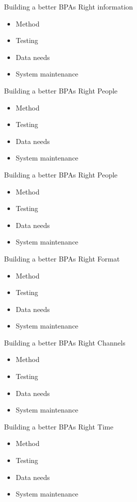 \documentclass[10pt]{beamer}
\begin{document}
\begin{frame}{Building a better BPAs}
Right information
\begin{itemize}
	\item Method
	\item Testing
	\item Data needs
	\item System maintenance 
\end{itemize}
\end{frame}

\begin{frame}{Building a better BPAs}
Right People
\begin{itemize}
	\item Method
	\item Testing
	\item Data needs
	\item System maintenance 
\end{itemize}
\end{frame}

\begin{frame}{Building a better BPAs}
Right People
\begin{itemize}
	\item Method
	\item Testing
	\item Data needs
	\item System maintenance 
\end{itemize}
\end{frame}

\begin{frame}{Building a better BPAs}
Right Format
\begin{itemize}
	\item Method
	\item Testing
	\item Data needs
	\item System maintenance 
\end{itemize}
\end{frame}

\begin{frame}{Building a better BPAs}
Right Channels
\begin{itemize}
	\item Method
	\item Testing
	\item Data needs
	\item System maintenance 
\end{itemize}
\end{frame}

\begin{frame}{Building a better BPAs}
Right Time
\begin{itemize}
	\item Method
	\item Testing
	\item Data needs
	\item System maintenance 
\end{itemize}
\end{frame}
\end{document}
